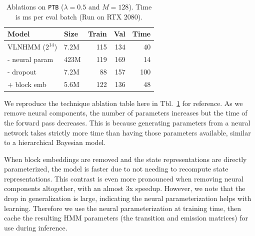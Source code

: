 \documentclass[11pt,a4paper]{article}
\begin{document}
\begin{table}[h]
\centering
\begin{tabular}{llrrr}
\toprule
Model                & Size & Train  & Val & Time \\
\midrule
VLNHMM ($2^{14}$)    & 7.2M & 115    & 134 & 40\\
\quad - neural param & 423M & 119    & 169 & 14\\
\quad - dropout      & 7.2M & 88     & 157 & 100\\
\quad + block emb    & 5.6M & 122    & 136 & 48\\
\bottomrule
\end{tabular}
\caption{\label{tbl:dropout-param-ablation-repeat}
Ablations on \texttt{PTB} ($\lambda =0.5$ and $M=128$). 
Time is ms per eval batch (Run on RTX 2080).
}
\end{table}

We reproduce the technique ablation table here in
Tbl.~\ref{tbl:dropout-param-ablation-repeat} for reference.
As we remove neural components, 
the number of parameters increases but the time of the
forward pass decreases.
This is because generating parameters from a neural network
takes strictly more time than having those parameters available,
similar to a hierarchical Bayesian model.

When block embeddings are removed and the state representations are
directly parameterized,
the model is faster due to not needing to recompute state representations.
This contrast is even more pronounced when removing neural components altogether,
with an almost 3x speedup.
However, we note that the drop in generalization is large,
indicating the neural parameterization helps with learning.
Therefore we use the neural parameterization at training time,
then cache the resulting HMM parameters (the transition and emission matrices)
for use during inference.
\end{document}
